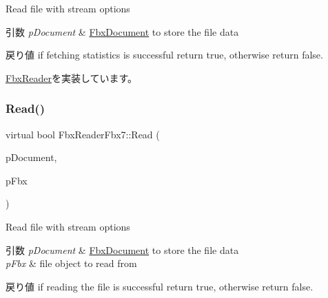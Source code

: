 Read file with stream options 
\begin{DoxyParams}{引数}
{\em p\+Document} & \hyperlink{class_fbx_document}{Fbx\+Document} to store the file data \\
\hline
\end{DoxyParams}
\begin{DoxyReturn}{戻り値}
if fetching statistics is successful return {\ttfamily true}, otherwise return {\ttfamily false}. 
\end{DoxyReturn}


\hyperlink{class_fbx_reader_a29941746acc73d7ffd2411a9be9d2525}{Fbx\+Reader}を実装しています。

\mbox{\label{class_fbx_reader_fbx7_adc92ab67daddb05f8ebce961443b6dd3}} 
\subsubsection{\texorpdfstring{Read()}{Read()}\hspace{0.1cm}{\footnotesize\ttfamily [2/2]}}
{\footnotesize\ttfamily virtual bool Fbx\+Reader\+Fbx7\+::\+Read (\begin{DoxyParamCaption}\item[{\hyperlink{class_fbx_document}{Fbx\+Document} $\ast$}]{p\+Document,  }\item[{\hyperlink{class_fbx_i_o}{Fbx\+IO} $\ast$}]{p\+Fbx }\end{DoxyParamCaption})\hspace{0.3cm}{\ttfamily [virtual]}}

Read file with stream options 
\begin{DoxyParams}{引数}
{\em p\+Document} & \hyperlink{class_fbx_document}{Fbx\+Document} to store the file data \\
\hline
{\em p\+Fbx} & file object to read from \\
\hline
\end{DoxyParams}
\begin{DoxyReturn}{戻り値}
if reading the file is successful return {\ttfamily true}, otherwise return {\ttfamily false}. 
\end{DoxyReturn}
\mbox{\label{class_fbx_reader_fbx7_a411118263811ffa136e233abfb5a0d02}} 
